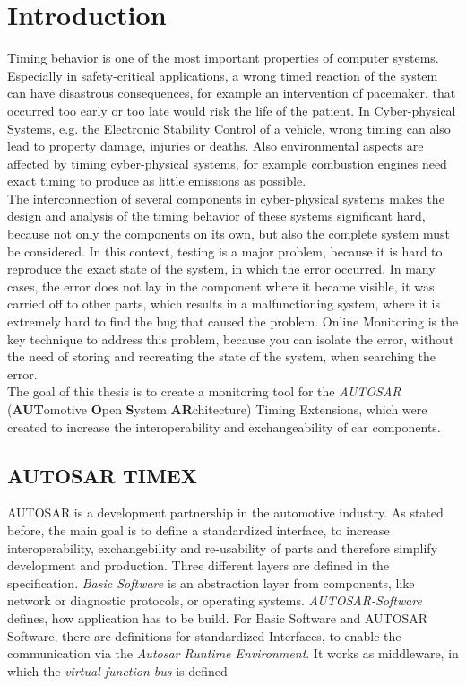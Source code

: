 
\chapter{Introduction}

Timing behavior is one of the most important properties of computer systems. Especially in safety-critical applications, a wrong timed reaction of the system can have disastrous consequences, for example an intervention of pacemaker, that occurred too early or too late would risk the life of the patient. In Cyber-physical Systems, e.g. the Electronic Stability Control of a vehicle, wrong timing can also lead to property damage, injuries or deaths. Also environmental aspects are affected by timing cyber-physical systems, for example combustion engines need exact timing to produce as little emissions as possible.\\
The interconnection of several components in cyber-physical systems makes the design and analysis of the timing behavior of these systems significant hard, because not only the components on its own, but also the complete system must be considered. In this context, testing is a major problem, because it is hard to reproduce the exact state of the system, in which the error occurred. In many cases, the error does not lay in the component where it became visible, it was carried off to other parts, which results in a malfunctioning system, where it is extremely hard to find the bug that caused the problem. Online Monitoring is the key technique to address this problem, because you can isolate the error, without the need of storing and recreating the state of the system, when searching the error.\\
The goal of this thesis is to create a monitoring tool for the \emph{AUTOSAR} (\textbf{AUT}omotive \textbf{O}pen \textbf{S}ystem \textbf{AR}chitecture) Timing Extensions, which were created to increase the interoperability and exchangeability of car components.

\section{AUTOSAR TIMEX}
AUTOSAR is a development partnership in the automotive industry. As stated before, the main goal is to define a standardized interface, to increase interoperability, exchangebility and re-usability of parts and therefore simplify development and production. Three different layers are defined in the specification. \emph{Basic Software} is an abstraction layer from components, like network or diagnostic protocols, or operating systems. \emph{AUTOSAR-Software} defines, how application has to be build. For Basic Software and AUTOSAR Software, there are definitions for standardized Interfaces, to enable the communication via the \emph{Autosar Runtime Environment}. It works as middleware, in which the \emph{virtual function bus} is defined
~\cite{Virtual_Functional_Bus}


